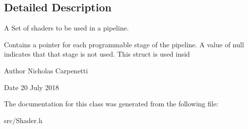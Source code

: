 \subsection{Detailed Description}
A Set of shaders to be used in a pipeline. 

Contains a pointer for each programmable stage of the pipeline. A value of null indicates that that stage is not used. This struct is used insid

\begin{DoxyAuthor}{Author}
Nicholas Carpenetti
\end{DoxyAuthor}
\begin{DoxyDate}{Date}
20 July 2018 
\end{DoxyDate}


The documentation for this class was generated from the following file\+:\begin{DoxyCompactItemize}
\item 
src/Shader.\+h\end{DoxyCompactItemize}
